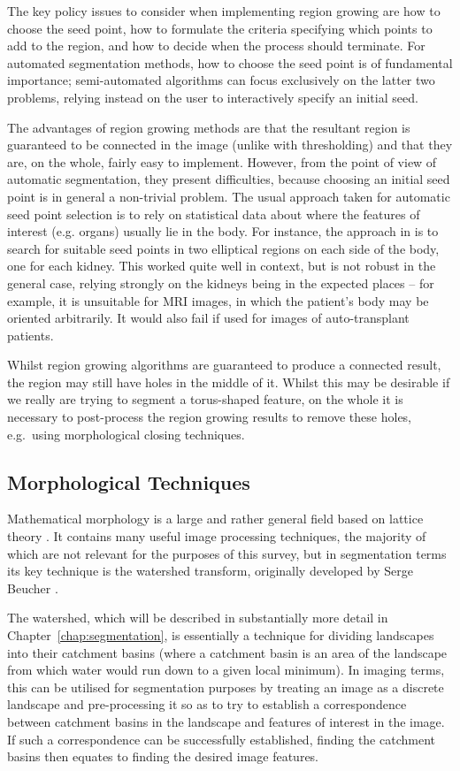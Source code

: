 The key policy issues to consider when implementing region growing are how to choose the seed point, how to formulate the criteria specifying which points to add to the region, and how to decide when the process should terminate. For automated segmentation methods, how to choose the seed point is of fundamental importance; semi-automated algorithms can focus exclusively on the latter two problems, relying instead on the user to interactively specify an initial seed.

The advantages of region growing methods are that the resultant region is guaranteed to be connected in the image (unlike with thresholding) and that they are, on the whole, fairly easy to implement. However, from the point of view of automatic segmentation, they present difficulties, because choosing an initial seed point is in general a non-trivial problem. The usual approach taken for automatic seed point selection is to rely on statistical data about where the features of interest (e.g. organs) usually lie in the body. For instance, the approach in \cite{lin06} is to search for suitable seed points in two elliptical regions on each side of the body, one for each kidney. This worked quite well in context, but is not robust in the general case, relying strongly on the kidneys being in the expected places -- for example, it is unsuitable for MRI images, in which the patient's body may be oriented arbitrarily. It would also fail if used for images of auto-transplant patients.

Whilst region growing algorithms are guaranteed to produce a connected result, the region may still have holes in the middle of it. Whilst this may be desirable if we really are trying to segment a torus-shaped feature, on the whole it is necessary to post-process the region growing results to remove these holes, e.g.~using morphological closing techniques.

\subsection{Morphological Techniques}

Mathematical morphology is a large and rather general field based on lattice theory \cite{?}. It contains many useful image processing techniques, the majority of which are not relevant for the purposes of this survey, but in segmentation terms its key technique is the watershed transform, originally developed by Serge Beucher \cite{beucher90}.

The watershed, which will be described in substantially more detail in Chapter~\ref{chap:segmentation}, is essentially a technique for dividing landscapes into their catchment basins (where a catchment basin is an area of the landscape from which water would run down to a given local minimum). In imaging terms, this can be utilised for segmentation purposes by treating an image as a discrete landscape and pre-processing it so as to try to establish a correspondence between catchment basins in the landscape and features of interest in the image. If such a correspondence can be successfully established, finding the catchment basins then equates to finding the desired image features.

